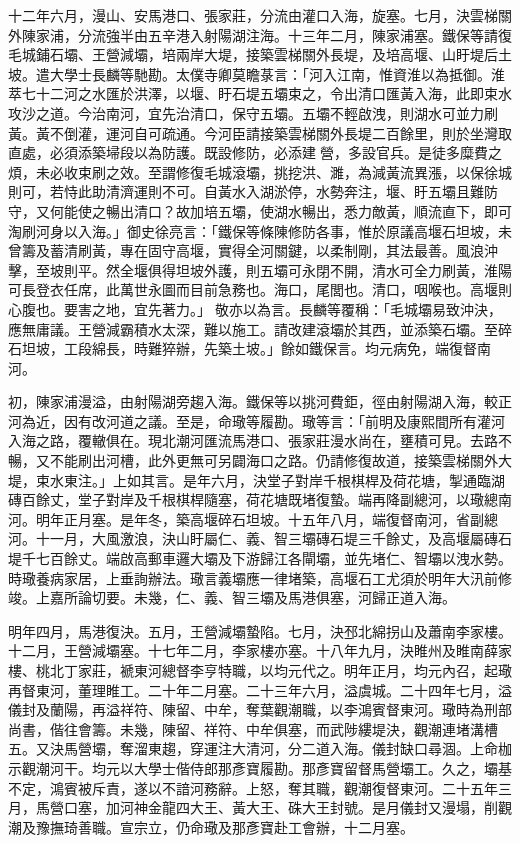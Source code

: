 \begin{pinyinscope}
十二年六月，漫山、安馬港口、張家莊，分流由灌口入海，旋塞。七月，決雲梯關外陳家浦，分流強半由五辛港入射陽湖注海。十三年二月，陳家浦塞。鐵保等請復毛城鋪石壩、王營減壩，培兩岸大堤，接築雲梯關外長堤，及培高堰、山盱堤后土坡。遣大學士長麟等馳勘。太僕寺卿莫瞻菉言：「河入江南，惟資淮以為抵御。淮萃七十二河之水匯於洪澤，以堰、盱石堤五壩束之，令出清口匯黃入海，此即束水攻沙之道。今治南河，宜先治清口，保守五壩。五壩不輕啟洩，則湖水可並力刷黃。黃不倒灌，運河自可疏通。今河臣請接築雲梯關外長堤二百餘里，則於坐灣取直處，必須添築埽段以為防護。既設修防，必添建營，多設官兵。是徒多糜費之煩，未必收束刷之效。至謂修復毛城滾壩，挑挖洪、濉，為減黃流異漲，以保徐城則可，若恃此助清濟運則不可。自黃水入湖淤停，水勢奔注，堰、盱五壩且難防守，又何能使之暢出清口？故加培五壩，使湖水暢出，悉力敵黃，順流直下，即可淘刷河身以入海。」御史徐亮言：「鐵保等條陳修防各事，惟於原議高堰石坦坡，未曾籌及蓄清刷黃，專在固守高堰，實得全河關鍵，以柔制剛，其法最善。風浪沖擊，至坡則平。然全堰俱得坦坡外護，則五壩可永閉不開，清水可全力刷黃，淮陽可長登衣任席，此萬世永圖而目前急務也。海口，尾閭也。清口，咽喉也。高堰則心腹也。要害之地，宜先著力。」敬亦以為言。長麟等覆稱：「毛城壩易致沖決，應無庸議。王營減霸積水太深，難以施工。請改建滾壩於其西，並添築石壩。至碎石坦坡，工段綿長，時難猝辦，先築土坡。」餘如鐵保言。均元病免，端復督南河。

初，陳家浦漫溢，由射陽湖旁趨入海。鐵保等以挑河費鉅，徑由射陽湖入海，較正河為近，因有改河道之議。至是，命璥等履勘。璥等言：「前明及康熙間所有灌河入海之路，覆轍俱在。現北潮河匯流馬港口、張家莊漫水尚在，壅積可見。去路不暢，又不能刷出河槽，此外更無可另闢海口之路。仍請修復故道，接築雲梯關外大堤，束水東注。」上如其言。是年六月，決堂子對岸千根棋桿及荷花塘，掣通臨湖磚百餘丈，堂子對岸及千根棋桿隨塞，荷花塘既堵復蟄。端再降副總河，以璥總南河。明年正月塞。是年冬，築高堰碎石坦坡。十五年八月，端復督南河，省副總河。十一月，大風激浪，決山盱屬仁、義、智三壩磚石堤三千餘丈，及高堰屬磚石堤千七百餘丈。端啟高郵車邏大壩及下游歸江各閘壩，並先堵仁、智壩以洩水勢。時璥養病家居，上垂詢辦法。璥言義壩應一律堵築，高堰石工尤須於明年大汛前修竣。上嘉所論切要。未幾，仁、義、智三壩及馬港俱塞，河歸正道入海。

明年四月，馬港復決。五月，王營減壩蟄陷。七月，決邳北綿拐山及蕭南李家樓。十二月，王營減壩塞。十七年二月，李家樓亦塞。十八年九月，決睢州及睢南薛家樓、桃北丁家莊，褫東河總督李亨特職，以均元代之。明年正月，均元內召，起璥再督東河，董理睢工。二十年二月塞。二十三年六月，溢虞城。二十四年七月，溢儀封及蘭陽，再溢祥符、陳留、中牟，奪葉觀潮職，以李鴻賓督東河。璥時為刑部尚書，偕往會籌。未幾，陳留、祥符、中牟俱塞，而武陟縷堤決，觀潮連堵溝槽五。又決馬營壩，奪溜東趨，穿運注大清河，分二道入海。儀封缺口尋涸。上命枷示觀潮河干。均元以大學士偕侍郎那彥寶履勘。那彥寶留督馬營壩工。久之，壩基不定，鴻賓被斥責，遂以不諳河務辭。上怒，奪其職，觀潮復督東河。二十五年三月，馬營口塞，加河神金龍四大王、黃大王、硃大王封號。是月儀封又漫塌，削觀潮及豫撫琦善職。宣宗立，仍命璥及那彥寶赴工會辦，十二月塞。


\end{pinyinscope}
